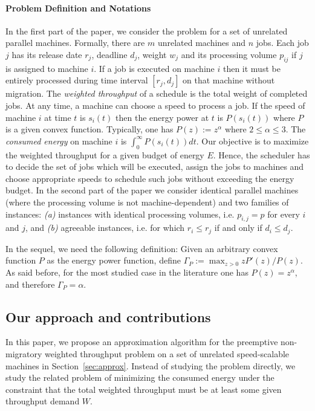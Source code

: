 \documentclass[11pt,a4paper]{article}
\begin{document}
\paragraph{Problem Definition and Notations} In the first part of the paper, we consider the problem for a set of unrelated parallel machines.
Formally, there are $m$ unrelated machines and $n$ jobs. Each job $j$ has its release date $r_{j}$, deadline $d_{j}$,
weight $w_{j}$ and its processing volume $p_{ij}$ if $j$ is assigned to machine $i$. If a job is executed on 
machine $i$ then it must be entirely processed during time interval $[r_{j},d_{j}]$ on that machine without migration. 
The \emph{weighted throughput} of a schedule is the total weight of completed jobs.  
At any time, a machine can choose a speed to process a job. If the speed of machine $i$ at time $t$ is 
$s_{i}(t)$ then the energy power at $t$ is $P(s_{i}(t))$ where $P$ is a given convex function.
Typically, one has $P(z) := z^{\alpha}$ where $2 \leq \alpha \leq 3$. The \emph{consumed energy} 
on machine $i$ is $\int_{0}^{\infty} P(s_{i}(t))dt$. 
Our objective is to maximize the weighted throughput for a given budget of energy $E$.
Hence, the scheduler has to decide the set of jobs which will be executed, assign the 
jobs to machines and choose appropriate speeds to schedule such jobs without exceeding 
the energy budget.  
In the second part of the paper we consider identical parallel machines (where the processing volume is not machine-dependent) and two  families of instances: {\em (a)} instances with identical processing volumes, i.e. $p_{i,j}=p$ for every $i$ and $j$, and {\em (b)} agreeable instances, i.e. for which $r_i \le r_j$ if and only if $d_i \le d_j$.

In the sequel, we need the following definition: Given an arbitrary convex function $P$ as the energy power function, define 
$\Gamma_{P} := \max_{z > 0} zP'(z)/P(z)$. As said before, for the most studied case in the literature one has $P(z) = z^{\alpha}$, and therefore 
$\Gamma_{P} = \alpha$. 




\subsection{Our approach and contributions}
In this paper, we propose an approximation algorithm for the preemptive non-migratory
weighted throughput problem
on a set of unrelated speed-scalable machines in Section~\ref{sec:approx}. 
Instead of studying the problem directly, 
we study the related problem of minimizing the consumed energy 
under the constraint that the total weighted throughput must be at least some given 
throughput demand $W$.
 
\end{document}
